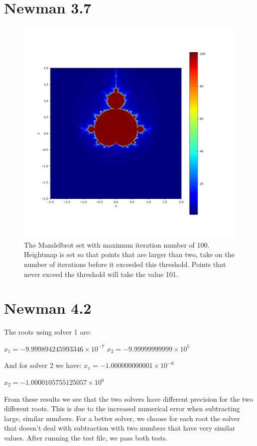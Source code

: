 \documentclass[11pt]{article}
\begin{document}
\section{Newman 3.7}
\begin{figure}[h!]
    \centering
    \includegraphics[width=1.0\textwidth]{fractal.png}
    \caption{The Mandelbrot set with maximum iteration number of 100. Heightmap is set so that points that are larger than two, take on the number of iterations before it exceeded this threshold. Points that never exceed the threshold will take the value 101. }
    \label{fig:your_label}
\end{figure}

\section{Newman 4.2}
The roots using solver 1 are: 

$x_1=-9.999894245993346 \times 10^{-7}$
$x_2=-9.99999999999 \times 10^{5}$

And for solver 2 we have: 
$x_1=-1.000000000001 \times 10^{-6}$

$x_2=-1.0000105755125057\times10^{6}$


From these results we see that the two solvers have different precision for the two different roots. This is due to the increased numerical error when subtracting large, similar numbers. For a better solver, we choose for each root the solver that doesn't deal with subtraction with two numbers that have very similar values. After running the test file, we pass both tests.
\end{document}
